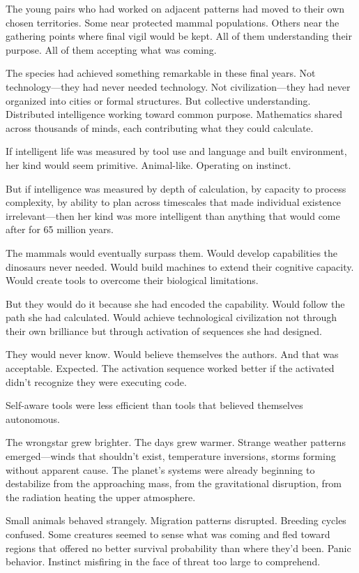 The young pairs who had worked on adjacent patterns had moved to their own chosen territories. Some near protected mammal populations. Others near the gathering points where final vigil would be kept. All of them understanding their purpose. All of them accepting what was coming.

The species had achieved something remarkable in these final years. Not technology—they had never needed technology. Not civilization—they had never organized into cities or formal structures. But collective understanding. Distributed intelligence working toward common purpose. Mathematics shared across thousands of minds, each contributing what they could calculate.

If intelligent life was measured by tool use and language and built environment, her kind would seem primitive. Animal-like. Operating on instinct.

But if intelligence was measured by depth of calculation, by capacity to process complexity, by ability to plan across timescales that made individual existence irrelevant—then her kind was more intelligent than anything that would come after for 65 million years.

The mammals would eventually surpass them. Would develop capabilities the dinosaurs never needed. Would build machines to extend their cognitive capacity. Would create tools to overcome their biological limitations.

But they would do it because she had encoded the capability. Would follow the path she had calculated. Would achieve technological civilization not through their own brilliance but through activation of sequences she had designed.

They would never know. Would believe themselves the authors. And that was acceptable. Expected. The activation sequence worked better if the activated didn't recognize they were executing code.

Self-aware tools were less efficient than tools that believed themselves autonomous.

\scenebreak

The wrongstar grew brighter. The days grew warmer. Strange weather patterns emerged—winds that shouldn't exist, temperature inversions, storms forming without apparent cause. The planet's systems were already beginning to destabilize from the approaching mass, from the gravitational disruption, from the radiation heating the upper atmosphere.

Small animals behaved strangely. Migration patterns disrupted. Breeding cycles confused. Some creatures seemed to sense what was coming and fled toward regions that offered no better survival probability than where they'd been. Panic behavior. Instinct misfiring in the face of threat too large to comprehend.

